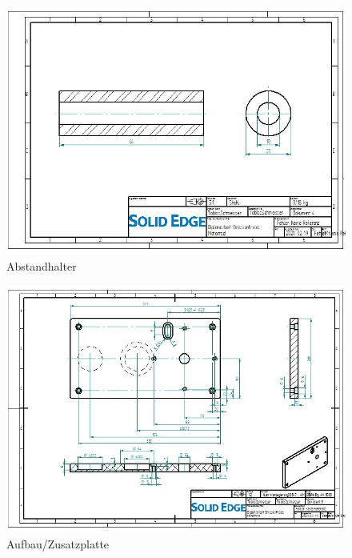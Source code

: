 \begin{figure} [H]
	\begin{center}
		\includegraphics[angle=90]{figures/mechanik/Seitenplatte_Abstandhalter_Zeichnung.jpg}
		\caption{Abstandhalter}
		\label{fig:Abstandhalter}
	\end{center}
\end{figure}

\begin{figure} [H]
	\begin{center}
		\includegraphics[angle=90]{figures/mechanik/Aufbau_Seitenplatte_Links_Zeichn.jpg}
		\caption{Aufbau/Zusatzplatte}
		\label{fig:Aufbau/Zusatzplatte}
	\end{center}
\end{figure}


